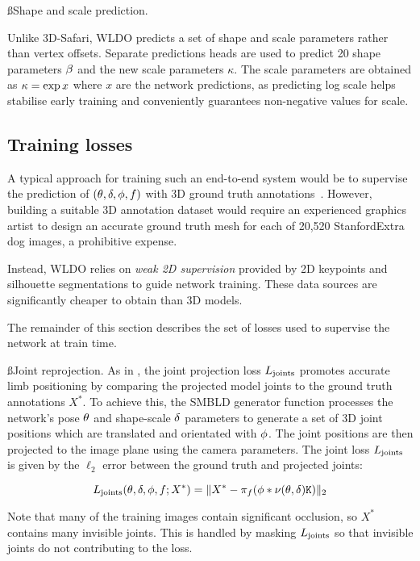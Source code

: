 \ss{Shape and scale prediction.}

Unlike 3D-Safari, WLDO predicts a set of shape and scale parameters rather than vertex offsets. Separate predictions heads are used to predict 20 shape parameters $\beta$ and the new scale parameters $\kappa$. The scale parameters are obtained as $\kappa = \exp{x}$ where $x$ are the network predictions, as predicting log scale helps stabilise early training and conveniently guarantees non-negative values for scale.

\subsection{Training losses}

A typical approach for training such an end-to-end system would be to supervise the prediction of $(\theta, \delta, \phi, f)$ with 3D ground truth annotations~\cite{kolotouros19learning,kanazawa18end-to-end,pavlakos18learning}. However, building a suitable 3D annotation dataset would require an experienced graphics artist to design an accurate ground truth mesh for each of 20,520 StanfordExtra dog images, a prohibitive expense.

Instead, WLDO relies on \emph{weak 2D supervision} provided by 2D keypoints and silhouette segmentations to guide network training. These data sources are significantly cheaper to obtain than 3D models.

The remainder of this section describes the set of losses used to supervise the network at train time.

\ss{Joint reprojection.}
As in , the joint projection loss $L_{\textrm{joints}}$ promotes accurate limb positioning by comparing the projected model joints to the ground truth annotations $X^{*}$. To achieve this, the SMBLD generator function processes the network's pose $\theta$ and shape-scale $\delta$ parameters to generate a set of 3D joint positions which are translated and orientated with $\phi$. The joint positions are then projected to the image plane using the camera parameters. The joint loss $L_{\textrm{joints}}$ is given by the $\ell_2$ error between the ground truth and projected joints:

\begin{equation}
L_{\textrm{joints}}(\theta, \delta, \phi, f; X^{*}) = \lVert X^{*} - \pi_{f}(\phi * \nu(\theta, \delta) \mathtt{K}) \rVert_{2}
\end{equation}

Note that many of the training images contain significant occlusion, so $X^{*}$ contains many invisible joints. This is handled by masking $L_{\textrm{joints}}$ so that invisible joints do not contributing to the loss.

